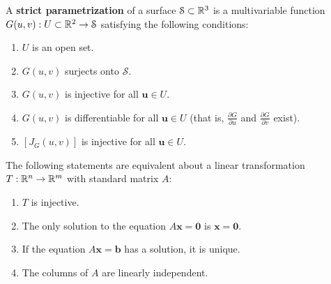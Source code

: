 \begin{definition}[]
    A \textbf{strict parametrization} of a surface $\mathcal{S} \subset \mathbb{R}^3$ is a multivariable function $G(u,v) : U \subset \mathbb{R}^2 \to \mathcal{S}$ satisfying the following conditions:
    \begin{enumerate}
        \item $U$ is an open set.
         
        \item $G(u,v)$ surjects onto $\mathcal{S}$.
        \item $G(u,v)$ is injective for all $\bm{u} \in U$.
     
        \item $G(u,v)$ is differentiable for all $\bm{u} \in U$ (that is, $\frac{\partial G}{\partial u}$ and $\frac{\partial G}{\partial v}$ exist).

        \item $[J_G(u,v)]$ is injective for all $\bm{u} \in U$.
    \end{enumerate}
    
    \end{definition}


\begin{theorem}
    The following statements are equivalent about a linear transformation $T : \mathbb{R}^n \to \mathbb{R}^m$ with standard matrix $A$:
    
    \begin{enumerate}
        \item $T$ is injective.
        \item The only solution to the equation $A\bm{x} = \bm{0}$ is $\bm{x} = \bm{0}$.
        \item If the equation $A\bm{x} = \bm{b}$ has a solution, it is unique.
        \item The columns of $A$ are linearly independent.
    \end{enumerate}
    
    \end{theorem}

